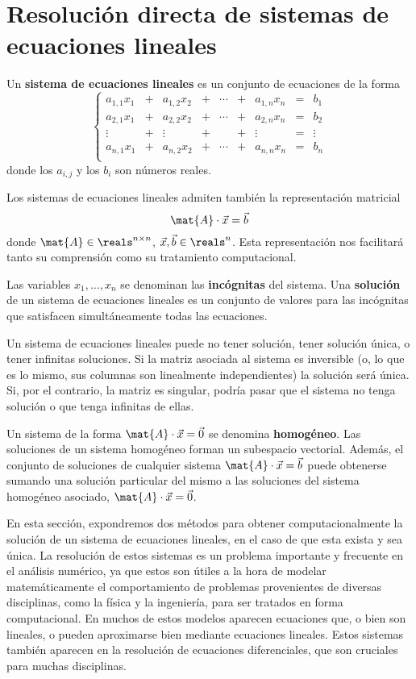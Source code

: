 
\section{Resolución directa de sistemas de ecuaciones lineales}
\label{section:sistemas-lineales}

Un \textbf{sistema de ecuaciones lineales} es un conjunto de ecuaciones de la
forma
\[ \left\lbrace \begin{matrix}
    a_{1,1} x_1 &+& a_{1,2} x_2 &+& \cdots &+& a_{1,n} x_n & = & b_1    \\
    a_{2,1} x_1 &+& a_{2,2} x_2 &+& \cdots &+& a_{2,n} x_n & = & b_2    \\
    \vdots     &+& \vdots     &+&     &+& \vdots     & = & \vdots \\
    a_{n,1} x_1 &+& a_{n,2} x_2 &+& \cdots &+& a_{n,n} x_n & = & b_n    \\
\end{matrix} \right. \]
donde los $a_{i,j}$ y los $b_i$ son números reales.

Los sistemas de ecuaciones lineales admiten también la representación
matricial
\[ \mat{A} \cdot \vec{x} = \vec{b} \]
donde $\mat{A} \in \reals ^{n \times n}$, $\vec{x}, \vec{b} \in \reals^{n}$.
Esta representación nos facilitará tanto su comprensión como su tratamiento
computacional.

Las variables $x_1, \dots, x_n$ se denominan las \textbf{incógnitas} del
sistema.
Una \textbf{solución} de un sistema de ecuaciones lineales es un conjunto de
valores para las incógnitas que satisfacen simultáneamente todas las
ecuaciones.

Un sistema de ecuaciones lineales puede no tener solución, tener solución
única, o tener infinitas soluciones. Si la matriz asociada al sistema es
inversible (o, lo que es lo mismo, sus columnas son linealmente
independientes) la solución será única. Si, por el contrario, la matriz es
singular, podría pasar que el sistema no tenga solución o que tenga infinitas
de ellas.

Un sistema de la forma $\mat{A} \cdot \vec{x} = \vec{0}$ se denomina
\textbf{homogéneo}. Las soluciones de un sistema homogéneo forman un
subespacio vectorial. Además, el conjunto de soluciones de cualquier sistema
$\mat{A} \cdot \vec{x} = \vec{b}$ puede obtenerse sumando una solución
particular del mismo a las soluciones del sistema homogéneo asociado, $\mat{A}
\cdot \vec{x} = \vec{0}$.

En esta sección, expondremos dos métodos para obtener computacionalmente la
solución de un sistema de ecuaciones lineales, en el caso de que esta exista y
sea única. La resolución de estos sistemas es un problema importante y
frecuente en el análisis numérico, ya que estos son útiles a la hora de
modelar matemáticamente el comportamiento de problemas provenientes de
diversas disciplinas, como la física y la ingeniería, para ser tratados en
forma computacional. En muchos de estos modelos aparecen ecuaciones
que, o bien son lineales, o pueden aproximarse bien mediante ecuaciones
lineales. Estos sistemas también aparecen en la resolución de ecuaciones
diferenciales, que son cruciales para muchas disciplinas.

